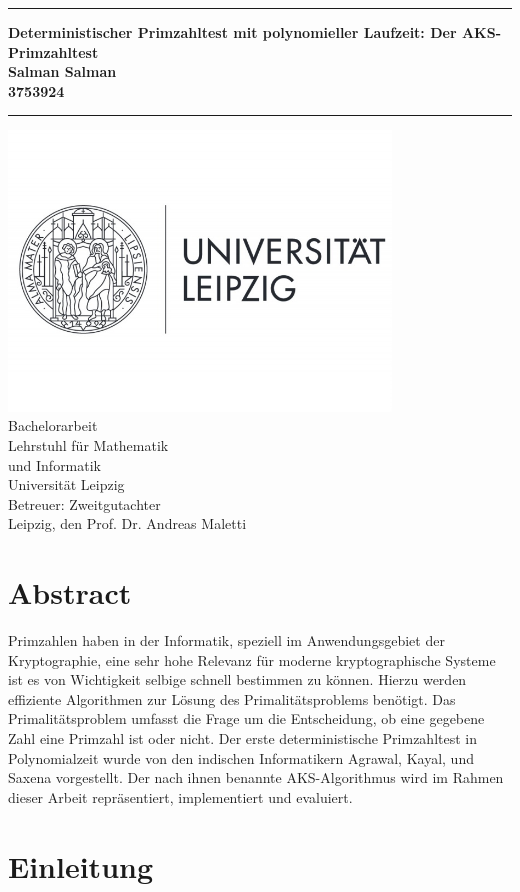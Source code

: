 \documentclass[12pt,oneside]{article}
\theoremstyle{remark}
\theoremstyle{definition}
\newcommand{\JMUTitle}[9]{

  \thispagestyle{empty}
  \vspace*{\stretch{1}}
  {\parindent0cm
  \rule{\linewidth}{.7ex}}
  \begin{flushright}
    \vspace*{\stretch{1}}
    \sffamily\bfseries\Huge
    #1\\
    \vspace*{\stretch{1}}
    \sffamily\bfseries\large
    #2\\
    \vspace*{\stretch{1}}
    \sffamily\bfseries\small
    #3
  \end{flushright}
  \rule{\linewidth}{.7ex}

  \vspace*{\stretch{1}}
  \begin{center}
    \includegraphics[width=4in]{logo} \\
    \vspace*{\stretch{1}}
    \Large  Bachelorarbeit   \\

    \vspace*{\stretch{2}}
   \large Lehrstuhl für Mathematik \\
    \large und Informatik \\
    \large Universität Leipzig\\
    \vspace*{\stretch{1}}
    \large Betreuer:  #8 \\[1mm]
    
    \vspace*{\stretch{1}}
    \large Leipzig, den #7
  \end{center}
}
\begin{document}
  \JMUTitle
      {Deterministischer Primzahltest mit polynomieller Laufzeit: Der AKS-Primzahltest}  
      {Salman Salman}                        
      {3753924}
      
      {Fakultät für Informatik und Mathematik}  %
      {Leipzig 2020}                          %
      {\today}                              %
      {Prof. Dr. Andreas Maletti}               %
      {Zweitgutachter}                          %
      
  \clearpage

\lhead{}
    \setcounter{page}{1}

\tableofcontents
\clearpage

\listoffigures

\listoftables
\clearpage

\setlength{\parskip}{0.5em} 


\section*{Abstract}
Primzahlen haben in der Informatik, speziell im Anwendungsgebiet der Kryptographie, eine sehr hohe Relevanz für moderne kryptographische Systeme ist es von Wichtigkeit selbige schnell bestimmen zu können. Hierzu werden effiziente Algorithmen zur Lösung des Primalitätsproblems benötigt. Das Primalitätsproblem umfasst die Frage um die Entscheidung, ob eine gegebene Zahl eine Primzahl ist oder nicht. Der erste deterministische Primzahltest in Polynomialzeit wurde von den indischen Informatikern Agrawal, Kayal, und Saxena vorgestellt. Der nach ihnen benannte AKS-Algorithmus wird im Rahmen dieser Arbeit repräsentiert, implementiert und evaluiert.  


\clearpage
{}  
    \setcounter{page}{1}
\lhead{\nouppercase{\leftmark}}


 

\section{Einleitung} \label{einleitung}
\end{document}
